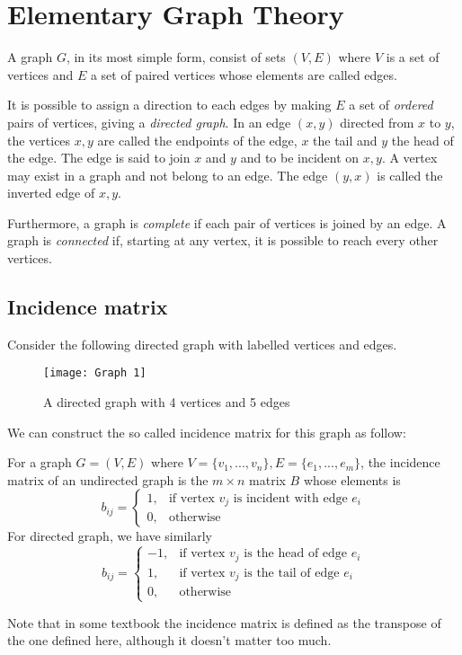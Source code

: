 \documentclass[11pt]{article}
\begin{document}
\maketitle{}
\tableofcontents{}
\pagebreak
\section{Elementary Graph Theory}

\begin{definition}[Graph]
  A graph \(G\), in its most simple form, consist of sets \((V,E)\) where \(V\) is a set of vertices and \(E\) a set of paired vertices whose elements are called edges.
\end{definition}

It is possible to assign a direction to each edges by making \(E\) a set of \emph{ordered} pairs of vertices, giving a \emph{directed graph}. In an edge \((x,y)\) directed from \(x\) to \(y\), the vertices \(x,y\) are called the endpoints of the edge, \(x\) the tail and \(y\) the head of the edge. The edge is said to join \(x\) and \(y\) and to be incident on \(x,y\). A vertex may exist in a graph and not belong to an edge. The edge \((y,x)\) is called the inverted edge of \(x,y\).

Furthermore, a graph is \emph{complete} if each pair of vertices is joined by an edge. A graph is \emph{connected} if, starting at any vertex, it is possible to reach every other vertices.

\subsection{Incidence matrix}
Consider the following directed graph with labelled vertices and edges.
\begin{figure}[h]
  \centering
  \texttt{[image: Graph 1]}
  \caption{A directed graph with 4 vertices and 5 edges}
\end{figure}
We can construct the so called incidence matrix for this graph as follow:
\begin{definition}
  For a graph \(G=(V,E)\) where \(V=\{v_1,...,v_n\},E=\{e_1,...,e_m\}\), the incidence matrix of an undirected graph is the \(m\times n\) matrix \(B\) whose elements is
  \[b_{ij}=\begin{cases}
    1,& \text{if vertex } v_j \text{ is incident with edge } e_i\\
    0,& \text{otherwise}
  \end{cases}\]
  For directed graph, we have similarly
  \[b_{ij}=\begin{cases}
    -1,& \text{if vertex } v_j \text{ is the head of edge } e_i\\
    1,& \text{if vertex } v_j \text{ is the tail of edge } e_i\\
    0,& \text{otherwise}
  \end{cases}\]
\end{definition}
Note that in some textbook the incidence matrix is defined as the transpose of the one defined here, although it doesn't matter too much.
\end{document}
